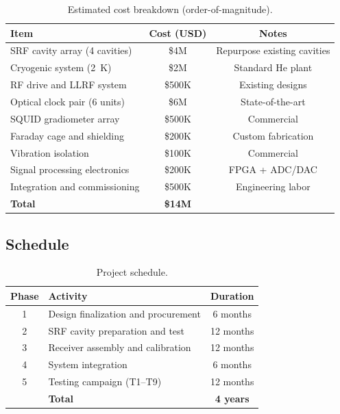 \documentclass[11pt,onecolumn]{article}
\begin{document}
\begin{table}[H]
\centering
\caption{Estimated cost breakdown (order-of-magnitude).}
\label{tab:cost}
\begin{tabular}{lcc}
\toprule
Item & Cost (USD) & Notes \\
\midrule
SRF cavity array (4 cavities) & \$4M & Repurpose existing cavities \\
Cryogenic system (2~K) & \$2M & Standard He plant \\
RF drive and LLRF system & \$500K & Existing designs \\
Optical clock pair (6 units) & \$6M & State-of-the-art \\
SQUID gradiometer array & \$500K & Commercial \\
Faraday cage and shielding & \$200K & Custom fabrication \\
Vibration isolation & \$100K & Commercial \\
Signal processing electronics & \$200K & FPGA + ADC/DAC \\
Integration and commissioning & \$500K & Engineering labor \\
\midrule
\textbf{Total} & \textbf{\$14M} & \\
\bottomrule
\end{tabular}
\end{table}

\subsection{Schedule}

\begin{table}[H]
\centering
\caption{Project schedule.}
\label{tab:schedule}
\begin{tabular}{clc}
\toprule
Phase & Activity & Duration \\
\midrule
1 & Design finalization and procurement & 6 months \\
2 & SRF cavity preparation and test & 12 months \\
3 & Receiver assembly and calibration & 12 months \\
4 & System integration & 6 months \\
5 & Testing campaign (T1--T9) & 12 months \\
\midrule
& \textbf{Total} & \textbf{4 years} \\
\bottomrule
\end{tabular}
\end{table}

\end{document}
